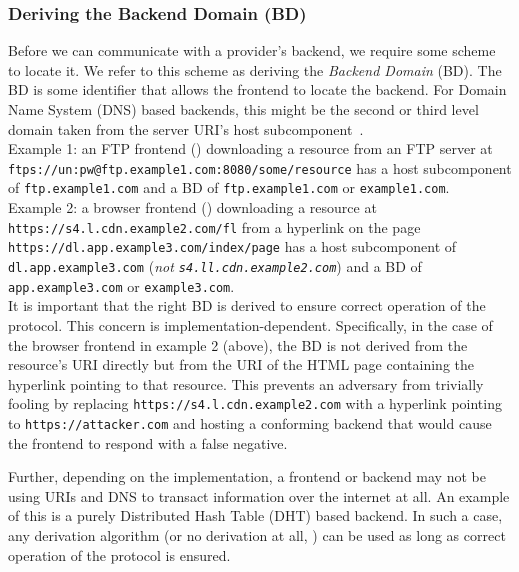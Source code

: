 \subsubsection{Deriving the Backend Domain (BD)}

Before we can communicate with a provider's backend, we require some scheme to
locate it. We refer to this scheme as deriving the \emph{Backend Domain} (BD).
The BD is some identifier that allows the frontend to locate the backend. For
Domain Name System (DNS) based backends, this might be the second or third level
domain taken from the server URI's host subcomponent~\cite{RFC3986}. \\

Example 1: an FTP frontend () downloading a
resource from an FTP server at
\texttt{ftps://un:pw@ftp.example1.com:8080/some/resource} has a host
subcomponent of \texttt{ftp.example1.com} and a BD of \texttt{ftp.example1.com}
or \texttt{example1.com}. \\

Example 2: a browser frontend () downloading a resource at \texttt{https://s4.l.cdn.example2.com/fl}
from a hyperlink on the page \texttt{https://dl.app.example3.com/index/page} has
a host subcomponent of \texttt{dl.app.example3.com} (\emph{not
\texttt{s4.ll.cdn.example2.com}}) and a BD of \texttt{app.example3.com} or
\texttt{example3.com}. \\

It is important that the right BD is derived to ensure correct operation of the
protocol. This concern is implementation-dependent. Specifically, in the case of
the browser frontend in example 2 (above), the BD is not derived from the
resource's URI directly but from the URI of the HTML page containing the
hyperlink pointing to that resource. This prevents an adversary from trivially
fooling \SYSTEM{} by replacing \texttt{https://s4.l.cdn.example2.com} with a
hyperlink pointing to \texttt{https://attacker.com} and hosting a conforming
\SYSTEM{} backend that would cause the frontend to respond with a false
negative.

Further, depending on the implementation, a frontend or backend may not be using
URIs and DNS to transact information over the internet at all. An example of
this is a purely Distributed Hash Table (DHT) based backend. In such a case, any
derivation algorithm (or no derivation at all, ) can be
used as long as correct operation of the protocol is ensured.

